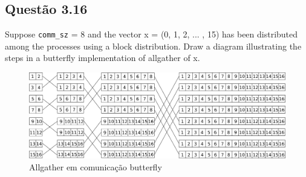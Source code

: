 

\subsection{Questão 3.16}

Suppose \texttt{comm\_sz} = 8 and the vector x = (0, 1, 2, ... , 15) has been distributed among the processes using a block distribution. Draw a diagram illustrating the steps in a butterfly implementation of allgather of x. \\


\begin{figure}[h!]
  \begin{center}
    \includegraphics[width=450pt]{sections/q3.16/imgs/g1.png}
  \end{center}
  \caption{Allgather em comunicação butterfly}
  \label{fig:allgatherbutterfly}
\end{figure}


